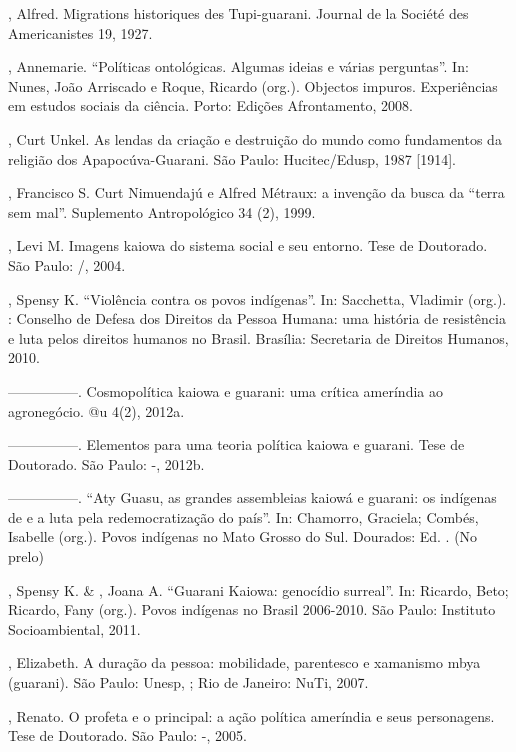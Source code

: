 \begin{Parskip}
, Alfred. Migrations historiques des Tupi-guarani. Journal
de la Société des Americanistes 19, 1927.

, Annemarie. ``Políticas ontológicas. Algumas ideias e várias
perguntas''. In: Nunes, João Arriscado e Roque, Ricardo (org.). Objectos
impuros. Experiências em estudos sociais da ciência. Porto: Edições
Afrontamento, 2008.

, Curt Unkel. As lendas da criação e destruição do mundo
como fundamentos da religião dos Apapocúva-Guarani. São Paulo:
Hucitec/Edusp, 1987 [1914].

, Francisco S. Curt Nimuendajú e Alfred Métraux: a invenção
da busca da ``terra sem mal''. Suplemento Antropológico 34 (2), 1999. 

, Levi M. Imagens kaiowa do sistema social e seu entorno.
Tese de Doutorado. São Paulo: /, 2004.

, Spensy K. ``Violência contra os povos indígenas''. In:
Sacchetta, Vladimir (org.). : Conselho de Defesa dos Direitos da
Pessoa Humana: uma história de resistência e luta pelos direitos
humanos no Brasil. Brasília: Secretaria de Direitos Humanos, 2010.

—————. Cosmopolítica kaiowa e guarani: uma crítica ameríndia ao
agronegócio. @u 4(2), 2012a.

—————. Elementos para uma teoria política kaiowa e guarani. Tese
de Doutorado. São Paulo: -, 2012b. 

—————. ``Aty Guasu, as grandes assembleias kaiowá e guarani: os
indígenas de  e a luta pela redemocratização do país''. In: Chamorro,
Graciela; Combés, Isabelle (org.). Povos indígenas no Mato Grosso do
Sul. Dourados: Ed. . (No prelo)

, Spensy K. \& , Joana A. ``Guarani Kaiowa: genocídio
surreal''. In: Ricardo, Beto; Ricardo, Fany (org.). Povos indígenas no
Brasil 2006-2010. São Paulo: Instituto Socioambiental, 2011.

, Elizabeth. A duração da pessoa: mobilidade, parentesco
e xamanismo mbya (guarani). São Paulo: Unesp, ; Rio de Janeiro:
NuTi, 2007.

, Renato. O profeta e o principal: a ação política
ameríndia e seus personagens. Tese de Doutorado. São Paulo: -,
2005.


\end{Parskip}
